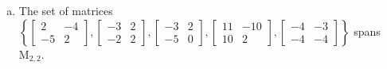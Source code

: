 \begin{exerciseAnswer}
\begin{enumerate}[(a)]
\begin{center}
\begin{minipage}{0.8\textwidth}
\[\begin{array}{cc}
-3 & 2 \\
-2 & 2
\end{array}\right] + y_{3} \left[\begin{array}{cc}
-3 & 2 \\
-5 & 0
\end{array}\right] + y_{4} \left[\begin{array}{cc}
11 & -10 \\
10 & 2
\end{array}\right] + y_{5} \left[\begin{array}{cc}
-4 & -3 \\
-4 & -4
\end{array}\right] =B\] has a solution for every \(B \in \mathrm{M}_{2,2}\). 
\end{minipage}\end{center}
    
\item The set of matrices \( \left\{ \left[\begin{array}{cc}
2 & -4 \\
-5 & 2
\end{array}\right] , \left[\begin{array}{cc}
-3 & 2 \\
-2 & 2
\end{array}\right] , \left[\begin{array}{cc}
-3 & 2 \\
-5 & 0
\end{array}\right] , \left[\begin{array}{cc}
11 & -10 \\
10 & 2
\end{array}\right] , \left[\begin{array}{cc}
-4 & -3 \\
-4 & -4
\end{array}\right] \right\} \) spans \(\mathrm{M}_{2,2}\). 
\end{enumerate}
    
\end{exerciseAnswer}
    
